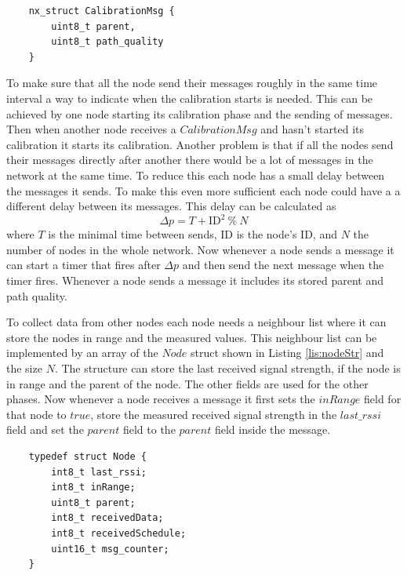 \begin{lstlisting}
	nx_struct CalibrationMsg {
		uint8_t parent,
		uint8_t path_quality
	}
\end{lstlisting}

To make sure that all the node send their messages roughly in the same time interval a way to indicate when the calibration starts is needed. This can be achieved by one node starting its calibration phase and the sending of messages. Then when another node receives a $CalibrationMsg$ and hasn't started its calibration it starts its calibration. Another problem is that if all the nodes send their messages directly after another there would be a lot of messages in the network at the same time. To reduce this each node has a small delay between the messages it sends. To make this even more sufficient each node could have a a different delay between its messages. This delay can be calculated as  
\[ \Delta p = T + \mbox{ID}^2\ \%\ N\]
where $T$ is the minimal time between sends, ID is the node's ID, and $N$ the number of nodes in the whole network. Now whenever a node sends a message it can start a timer that fires after $\Delta p$ and then send the next message when the timer fires. Whenever a node sends a message it includes its stored parent and path quality.  

To collect data from other nodes each node needs a neighbour list where it can store the nodes in range and the measured values. This neighbour list can be implemented by an array of the $Node$ struct shown in Listing \ref{lis:nodeStr} and the size $N$. The structure can store the last received signal strength, if the node is in range and the parent of the node. The other fields are used for the other phases. Now whenever a node receives a message it first sets the $inRange$ field for that node to $true$, store the measured received signal strength in the $last\_rssi$ field and set the $parent$ field to the $parent$ field inside the message. 
 

\begin{lstlisting}
	typedef struct Node {
  		int8_t last_rssi;
  		int8_t inRange;
  		uint8_t parent;
  		int8_t receivedData;
  		int8_t receivedSchedule;
  		uint16_t msg_counter;
	}
\end{lstlisting}

